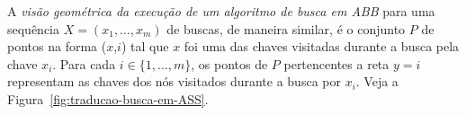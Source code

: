 A \textit{visão geométrica da execução de um algoritmo de busca em ABB} para uma sequência $X = (x_{1},\ldots,x_{m})$ de buscas, de maneira similar, é o conjunto $P$ de pontos na forma ($x$,$i$) tal que $x$ foi uma das chaves visitadas durante a busca pela chave $x_i$. Para cada $i \in \{1,\ldots,m\}$, os pontos de $P$ pertencentes a reta $y = i$ representam as chaves dos nós visitados durante a busca por $x_i$. Veja a Figura~\ref{fig:traducao-busca-em-ASS}.

\begin{figure}[h!]
    \centering
    \begin{minipage}[b]{0.34\textwidth}
        \centering
    \end{minipage}\hfill
    \begin{minipage}[b]{0.33\textwidth}
        \centering
\end{minipage}
\end{figure}
